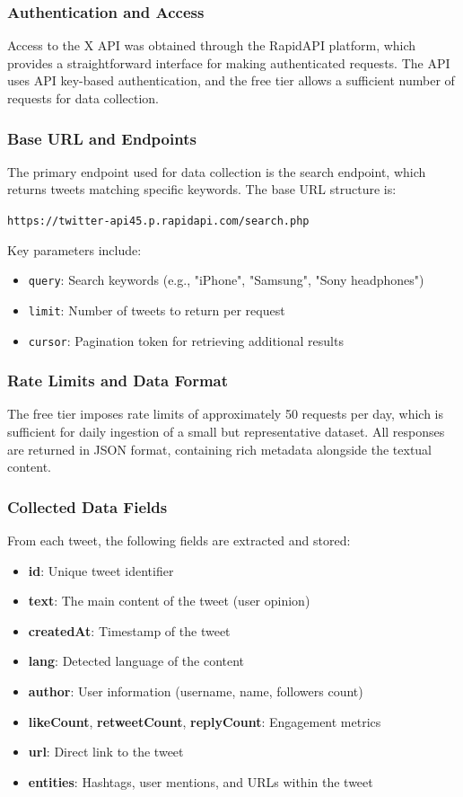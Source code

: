 \documentclass[12pt]{article}
\begin{document}
\subsubsection{Authentication and Access}
Access to the X API was obtained through the RapidAPI platform, which provides a straightforward interface for making authenticated requests. The API uses API key-based authentication, and the free tier allows a sufficient number of requests for data collection.

\subsubsection{Base URL and Endpoints}
The primary endpoint used for data collection is the search endpoint, which returns tweets matching specific keywords. The base URL structure is:

\texttt{https://twitter-api45.p.rapidapi.com/search.php}

Key parameters include:
\begin{itemize}
    \item \texttt{query}: Search keywords (e.g., "iPhone", "Samsung", "Sony headphones")
    \item \texttt{limit}: Number of tweets to return per request
    \item \texttt{cursor}: Pagination token for retrieving additional results
\end{itemize}

\subsubsection{Rate Limits and Data Format}
The free tier imposes rate limits of approximately 50 requests per day, which is sufficient for daily ingestion of a small but representative dataset. All responses are returned in JSON format, containing rich metadata alongside the textual content.

\subsubsection{Collected Data Fields}
From each tweet, the following fields are extracted and stored:
\begin{itemize}
    \item \textbf{id}: Unique tweet identifier
    \item \textbf{text}: The main content of the tweet (user opinion)
    \item \textbf{createdAt}: Timestamp of the tweet
    \item \textbf{lang}: Detected language of the content
    \item \textbf{author}: User information (username, name, followers count)
    \item \textbf{likeCount}, \textbf{retweetCount}, \textbf{replyCount}: Engagement metrics
    \item \textbf{url}: Direct link to the tweet
    \item \textbf{entities}: Hashtags, user mentions, and URLs within the tweet
\end{itemize}
\end{document}

